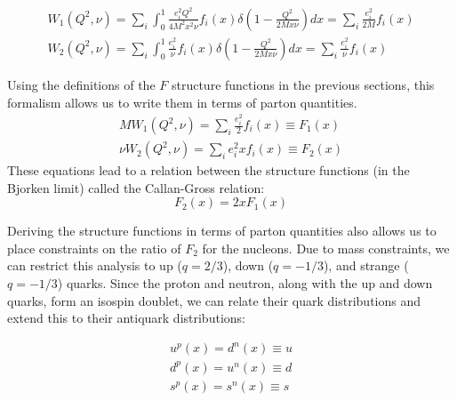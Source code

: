 \begin{subequations}
\begin{align}
	W_{1}\left(Q^{2},\nu\right) = \sum_{i}\int_0^1 \frac{e_{i}^{2}Q^2}{4M^{2}x^{2}\nu}f_{i}\left(x\right)\delta\left(1-\frac{Q^2}{2Mx\nu}\right) dx = \sum_{i} \frac{e_{i}^{2}}{2M}f_{i}\left(x\right) \\
	W_{2}\left(Q^{2},\nu\right) = \sum_{i}\int_0^1 \frac{e_{i}^{2}}{\nu}f_{i}\left(x\right)\delta\left(1-\frac{Q^2}{2Mx\nu}\right) dx = \sum_{i} \frac{e_{i}^{2}}{\nu}f_{i}\left(x\right)
\end{align}
\end{subequations}

Using the definitions of the $F$ structure functions in the previous sections, this formalism allows us to write them in terms of parton quantities.
\begin{subequations}
\begin{align}
	MW_1\left(Q^2,\nu\right) = \sum_i \frac{e_i^2}{2} f_i\left(x\right) \equiv F_1\left(x\right) \\
	\nu W_2\left(Q^2,\nu\right) = \sum_i e_i^2 x f_i\left(x\right) \equiv F_2\left(x\right)
\end{align}
\end{subequations}
These equations lead to a relation between the structure functions (in the Bjorken limit) called the Callan-Gross relation:
\begin{equation}
	F_2\left(x\right) = 2xF_1\left(x\right)
\end{equation}


Deriving the structure functions in terms of parton quantities also allows us to place constraints on the ratio of $F_2$ for the nucleons. Due to mass constraints, we can restrict this analysis to up ($q=2/3$), down ($q=-1/3$), and strange ($q=-1/3$) quarks. Since the proton and neutron, along with the up and down quarks, form an isospin doublet, we can relate their quark distributions and extend this to their antiquark distributions:

\begin{subequations}
\begin{align}
	u^p\left(x\right) = d^n\left(x\right) \equiv u \\
	d^p\left(x\right) = u^n\left(x\right) \equiv d \\
	s^p\left(x\right) = s^n\left(x\right) \equiv s 
\end{align}
\end{subequations}

